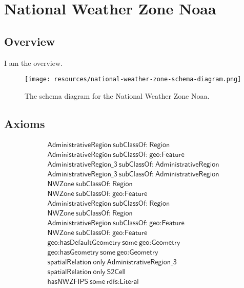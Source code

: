 
\section{National Weather Zone Noaa}
\label{sec:national-weather-zone-noaa}
\subsection{Overview}
\label{ssec:overview}

I am the overview.

\begin{figure}[h!]
  \begin{center}
    \texttt{[image: resources/national-weather-zone-schema-diagram.png]}
  \end{center}
  \caption{The schema diagram for the National Weather Zone Noaa.}
  \label{fig:ov-diagram}
\end{figure}


\subsection{Axioms}
\begin{align}
  \textsf{AdministrativeRegion}~\textsf{subClassOf:}~\textsf{Region}\\
  \textsf{AdministrativeRegion}~\textsf{subClassOf:}~\textsf{geo:Feature}\\
  \textsf{AdministrativeRegion\_3}~\textsf{subClassOf:}~\textsf{AdministrativeRegion}\\
  \textsf{AdministrativeRegion\_3}~\textsf{subClassOf:}~\textsf{AdministrativeRegion}\\
  \textsf{NWZone}~\textsf{subClassOf:}~\textsf{Region}\\
  \textsf{NWZone}~\textsf{subClassOf:}~\textsf{geo:Feature}\\
  \textsf{AdministrativeRegion}~\textsf{subClassOf:}~\textsf{Region}\\
  \textsf{NWZone}~\textsf{subClassOf:}~\textsf{Region}\\
  \textsf{AdministrativeRegion}~\textsf{subClassOf:}~\textsf{geo:Feature}\\
  \textsf{NWZone}~\textsf{subClassOf:}~\textsf{geo:Feature}\\
  \textsf{geo:hasDefaultGeometry}~\textsf{some}~\textsf{geo:Geometry}\\
  \textsf{geo:hasGeometry}~\textsf{some}~\textsf{geo:Geometry}\\
  \textsf{spatialRelation}~\textsf{only}~\textsf{AdministrativeRegion\_3}\\
  \textsf{spatialRelation}~\textsf{only}~\textsf{S2Cell}\\
  \textsf{hasNWZFIPS}~\textsf{some}~\textsf{rdfs:Literal}\end{align}


